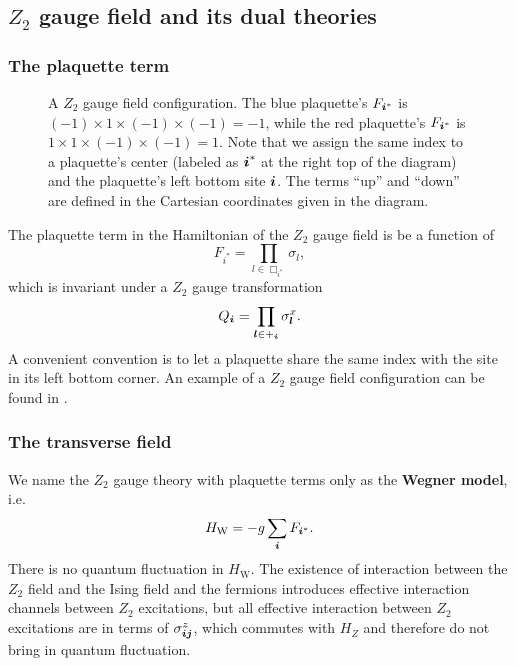 \documentclass[hyperref, a4paper]{article}
\newcommand*{\concept}[1]{{\textbf{#1}}}
\newcommand*{\Ztwo}{$\mathbb{Z}_2$ }
\def\mathbb#1{#1}%
\begin{document}
\subsection{\Ztwo gauge field and its dual theories}

\subsubsection{The plaquette term}

\begin{figure}
    \centering
    
    \caption{A \Ztwo gauge field configuration. The blue plaquette's $F_{\vb*{i}^*}$ is $(-1) \times 1 \times (-1) \times (-1) = -1$, %
    while the red plaquette's $F_{\vb*{i}^*}$ is $1 \times 1 \times (-1) \times (-1) = 1$. %
    Note that we assign the same index to a plaquette's center (labeled as $\vb*{i}^*$ at the right top of the diagram) %
    and the plaquette's left bottom site $\vb*{i}$. %
    The terms ``up'' and ``down'' are defined in the Cartesian coordinates given in the diagram.}
    \label{fig:z2-gauge-field}
\end{figure}

The plaquette term in the Hamiltonian of the \Ztwo gauge field is be a function of
\begin{equation}
    F_{i^*} = \prod_{l \in \Box_{i^*}} \sigma_l,
\end{equation}
which is invariant under a \Ztwo gauge transformation
\begin{equation}
    Q_{\vb*{i}} = \prod_{\vb*{l} \in +_{\vb*{i}}} \sigma^x_{\vb*{l}}.
\end{equation}
A convenient convention is to let a plaquette share the same index with the site in its left bottom corner. 
An example of a \Ztwo gauge field configuration can be found in .

\subsubsection{The transverse field}

We name the \Ztwo gauge theory with plaquette terms only as the \concept{Wegner model}, i.e.
\begin{equation}
    H_\text{W} = - g \sum_{\vb*{i}} F_{{\vb*{i}}^*}.
\end{equation}
There is no quantum fluctuation in $H_\text{W}$. 
The existence of interaction between the \Ztwo field and the Ising field and the fermions introduces effective interaction channels between \Ztwo excitations, but all effective interaction between \Ztwo excitations are in terms of $\sigma^z_{\vb*{i} \vb*{j}}$, which commutes with $H_Z$ and therefore do not bring in quantum fluctuation.
\end{document}

